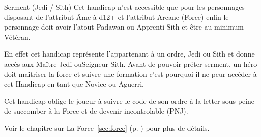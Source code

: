 \begin{paperbox}{Serment (Jedi / Sith)}
    Cet handicap n'est accessible que pour les personnages disposant de l'attribut \^Ame à d12+ et l'attribut Arcane (Force) enfin le personnage doit avoir l'atout Padawan ou Apprenti Sith et être au minimum Vétéran. 

    En effet cet handicap représente l'appartenant à un ordre, Jedi ou Sith et donne accès aux Maître Jedi ouSeigneur Sith. Avant de pouvoir préter serment, un héro doit maitriser la force et suivre une formation c'est pourquoi il ne peur accéder à cet Handicap en tant que Novice ou Aguerri.

    Cet handicap oblige le joueur à suivre le code de son ordre à la letter sous peine de succomber à la Force et de devenir incontrolable (PNJ).

    Voir le chapitre sur La Force~\ref{sec:force} (p. \pageref{sec:force}) pour plus de détails.
\end{paperbox}

